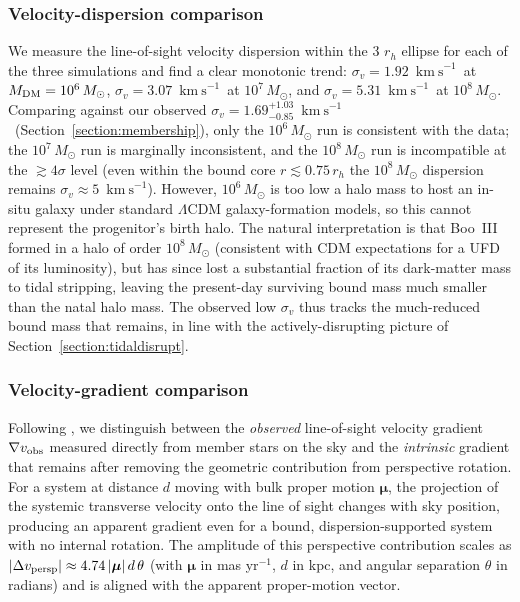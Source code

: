 \documentclass[twocolumn, apj, numberedappendix, appendixfloats]{openjournal_dhayaa}
\newcommand{\vlosUnits}{$\mathrm{km~s}^{-1}$\xspace}
\begin{document}
\subsubsection{Velocity-dispersion comparison} \label{section:tidaldisrupt_vdisp}
We measure the line-of-sight velocity dispersion within the 3 $r_h$ ellipse for each of the three simulations and find a clear monotonic trend: $\sigma_v = 1.92$~\vlosUnits\ at $M_{\rm DM} = 10^6\,M_\odot$, $\sigma_v = 3.07$~\vlosUnits\ at $10^7\,M_\odot$, and $\sigma_v = 5.31$~\vlosUnits\ at $10^8\,M_\odot$. Comparing against our observed $\sigma_v = 1.69^{+1.03}_{-0.85}$~\vlosUnits\ (Section~\ref{section:membership}), only the $10^6\,M_\odot$ run is consistent with the data; the $10^7\,M_\odot$ run is marginally inconsistent, and the $10^8\,M_\odot$ run is incompatible at the $\gtrsim 4\sigma$ level (even within the bound core $r \lesssim 0.75\,r_h$ the $10^8\,M_\odot$ dispersion remains $\sigma_v \approx 5$~\vlosUnits). However, $10^6\,M_\odot$ is too low a halo mass to host an in-situ galaxy under standard $\Lambda$CDM galaxy-formation models, so this cannot represent the progenitor's birth halo. The natural interpretation is that Boo~III formed in a halo of order $10^8\,M_\odot$ (consistent with CDM expectations for a UFD of its luminosity), but has since lost a substantial fraction of its dark-matter mass to tidal stripping, leaving the present-day surviving bound mass much smaller than the natal halo mass. The observed low $\sigma_v$ thus tracks the much-reduced bound mass that remains, in line with the actively-disrupting picture of Section~\ref{section:tidaldisrupt}.

\subsubsection{Velocity-gradient comparison}
Following \citet{Sandford2025}, we distinguish between the \emph{observed} line-of-sight velocity gradient $\nabla v_{\rm obs}$ measured directly from member stars on the sky and the \emph{intrinsic} gradient that remains after removing the geometric contribution from perspective rotation. For a system at distance $d$ moving with bulk proper motion $\boldsymbol{\mu}$, the projection of the systemic transverse velocity onto the line of sight changes with sky position, producing an apparent gradient even for a bound, dispersion-supported system with no internal rotation. The amplitude of this perspective contribution scales as $|\Delta v_{\rm persp}| \approx 4.74\,|\boldsymbol{\mu}|\,d\,\theta$ (with $\boldsymbol{\mu}$ in mas yr$^{-1}$, $d$ in kpc, and angular separation $\theta$ in radians) and is aligned with the apparent proper-motion vector.
\end{document}
